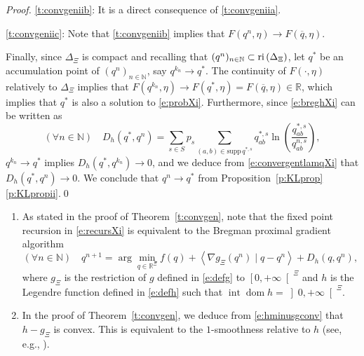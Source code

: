 \documentclass[smallextended,referee,envcountsect,]{svjour3}
\newcommand{\RP}{\ensuremath{\left[0,+\infty\right[}}
\newcommand{\RPP}{\ensuremath{\left]0,+\infty\right[}}
\newcommand{\reli}{\ensuremath{\text{\rm ri}\,}}
\newcommand{\NN}{{\mathbb N}}
\newcommand{\R}{{\mathbb R}}
\newcommand{\dom}{\ensuremath{\operatorname{dom}}}
\newcommand{\inte}{\ensuremath{\operatorname{int}}}
\newcommand{\scal}[2]{{\left\langle{{#1}\mid{#2}}\right\rangle}}
\newcommand{\supp}{\mathrm{supp}\,}
\begin{document}
\begin{proof}
{\ref{t:convgeniib}: It is a direct consequence of \ref{t:convgeniia}.

\ref{t:convgeniic}: Note that \ref{t:convgeniib} implies that
$F(q^{n},\eta)\to 
F(\overline{q},\eta)$.}
Finally, since $\Delta_{\Xi}$ is compact and recalling that 
$(q^n)_{n\in\NN}\subset \reli(\Delta_{\Xi})$,
let $q^*$ be an accumulation point of $(q^n)_{n\in\NN}$, say 
$q^{k_n}\to 
q^*$. The continuity of $F(\cdot,\eta)$ relatively to 
$\Delta_{\Xi}$ implies that
$F(q^{k_n},\eta)\to 
F(q^*,\eta)=F(\overline{q},\eta)\in\R$,
 which { implies that $q^*$ is also a solution to 
 \eqref{e:probXi}.  Furthermore, since \eqref{e:breghXi} 
can be written as
\begin{equation}
(\forall n\in\NN)\quad D_h(q^*,q^n)=
\sum_{s\in S}p_s\sum_{(a,b)\in\supp 
q^{*,s}}q^{*,s}_{ab}\ln\left(\frac{q^{*,s}_{ab}}{q^{n,s}_{ab}}\right),
\end{equation}
$q^{k_n}\to q^*$ implies $D_{h}({q}^*,q^{k_n})\to 0$, and } 
we deduce from 
\eqref{e:convergentlamqXi} that $D_{h}({q}^*,q^{n})\to 0$.
We conclude that $q^n\to q^*$ from 
Proposition~\ref{p:KLprop}\eqref{p:KLpropii}.\qed
\end{proof}
{
\begin{remark}
\begin{enumerate}
\item As stated in the proof of Theorem~\ref{t:convgen},
note that the fixed point recursion in 
\eqref{e:recursXi} is equivalent to the Bregman proximal gradient 
algorithm
\begin{equation}
(\forall n\in\NN)\quad q^{n+1}=\arg\min_{q\in 
\R^\Xi}f(q)+\scal{\nabla
 g_{\Xi}(q^n)}{q-q^n}+D_h(q,q^n),
\end{equation}
where $g_{\Xi}$ is the restriction of $g$ 
defined in 
\eqref{e:defg} to $\RP^\Xi$ and $h$ is the Legendre function 
defined in \eqref{e:defh} such that $\inte\dom h=\RPP^{\Xi}$. 

\item In the proof of Theorem~\ref{t:convgen}, we deduce 
from \eqref{e:hminusgconv} that $h-g_{\Xi}$ is convex. This is 
equivalent to the $1$-smoothness relative to $h$ (see, e.g., 
\cite{BauMOR,lu2018}).
\end{enumerate}


\end{remark}
}
\end{document}
